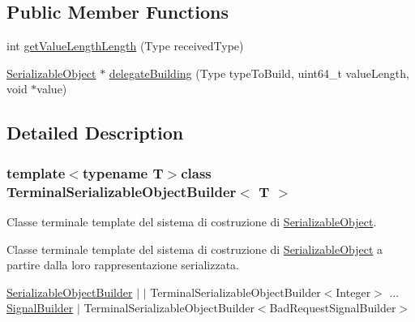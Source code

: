 \subsection*{Public Member Functions}
\begin{DoxyCompactItemize}
\item 
int \hyperlink{class_terminal_serializable_object_builder_a8d52457d52b7f98ec4c4e83405dea383}{getValueLengthLength} (Type receivedType)
\item 
\hyperlink{class_serializable_object}{SerializableObject} $\ast$ \hyperlink{class_terminal_serializable_object_builder_a87c15acd24e1d9752d7dc1887d955eed}{delegateBuilding} (Type typeToBuild, uint64\_\-t valueLength, void $\ast$value)
\end{DoxyCompactItemize}


\subsection{Detailed Description}
\subsubsection*{template$<$typename T$>$class TerminalSerializableObjectBuilder$<$ T $>$}

Classe terminale template del sistema di costruzione di \hyperlink{class_serializable_object}{SerializableObject}. 

Classe terminale template del sistema di costruzione di \hyperlink{class_serializable_object}{SerializableObject} a partire dalla loro rappresentazione serializzata.

\hyperlink{class_serializable_object_builder}{SerializableObjectBuilder} $|$ $|$ TerminalSerializableObjectBuilder$<$Integer$>$ ... \hyperlink{class_signal_builder}{SignalBuilder} $|$ TerminalSerializableObjectBuilder$<$BadRequestSignalBuilder$>$ 

